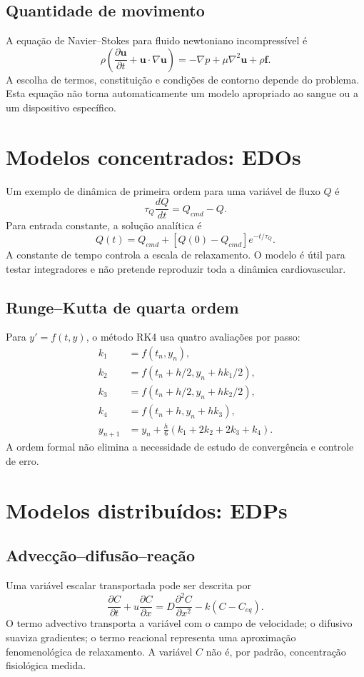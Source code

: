 \documentclass[11pt,a4paper,oneside]{book}
\begin{document}
\section{Quantidade de movimento}
A equação de Navier--Stokes para fluido newtoniano incompressível é
\[
\rho\left(\frac{\partial\mathbf{u}}{\partial t}
+\mathbf{u}\cdot\nabla\mathbf{u}\right)
=-\nabla p+\mu\nabla^2\mathbf{u}+\rho\mathbf{f}.
\]
A escolha de termos, constituição e condições de contorno depende do problema. Esta equação não torna automaticamente um modelo apropriado ao sangue ou a um dispositivo específico.

\chapter{Modelos concentrados: EDOs}
Um exemplo de dinâmica de primeira ordem para uma variável de fluxo $Q$ é
\[
\tau_Q\frac{dQ}{dt}=Q_{cmd}-Q.
\]
Para entrada constante, a solução analítica é
\[
Q(t)=Q_{cmd}+[Q(0)-Q_{cmd}]e^{-t/\tau_Q}.
\]
A constante de tempo controla a escala de relaxamento. O modelo é útil para testar integradores e não pretende reproduzir toda a dinâmica cardiovascular.

\section{Runge--Kutta de quarta ordem}
Para $y'=f(t,y)$, o método RK4 usa quatro avaliações por passo:
\[
\begin{aligned}
k_1&=f(t_n,y_n),\\
k_2&=f(t_n+h/2,y_n+hk_1/2),\\
k_3&=f(t_n+h/2,y_n+hk_2/2),\\
k_4&=f(t_n+h,y_n+hk_3),\\
y_{n+1}&=y_n+\frac{h}{6}(k_1+2k_2+2k_3+k_4).
\end{aligned}
\]
A ordem formal não elimina a necessidade de estudo de convergência e controle de erro.

\chapter{Modelos distribuídos: EDPs}
\section{Advecção--difusão--reação}
Uma variável escalar transportada pode ser descrita por
\[
\frac{\partial C}{\partial t}
+u\frac{\partial C}{\partial x}
=D\frac{\partial^2 C}{\partial x^2}-k(C-C_{eq}).
\]
O termo advectivo transporta a variável com o campo de velocidade; o difusivo suaviza gradientes; o termo reacional representa uma aproximação fenomenológica de relaxamento. A variável $C$ não é, por padrão, concentração fisiológica medida.
\end{document}
